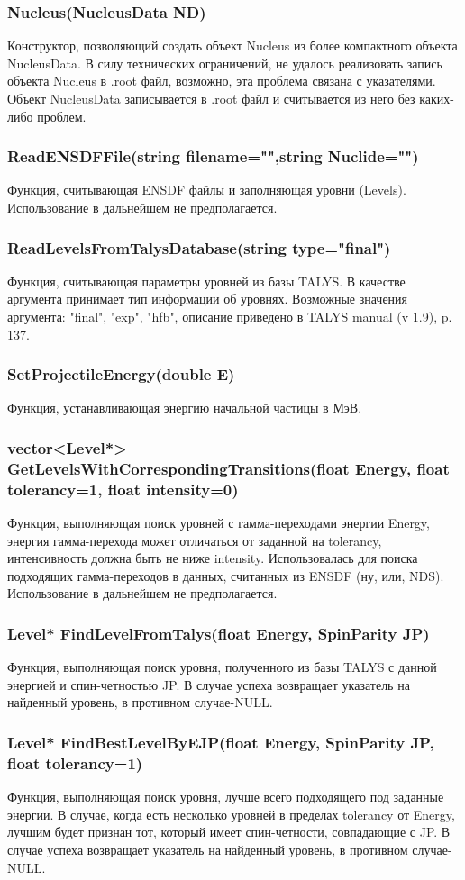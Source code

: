 \documentclass[a4paper,12pt]{extarticle}
\begin{document}
\subsubsection{Nucleus(NucleusData ND)}
Конструктор, позволяющий создать объект Nucleus из более компактного объекта NucleusData. В силу технических ограничений, не удалось реализовать запись объекта Nucleus в .root файл, возможно, эта проблема связана с указателями. Объект NucleusData записывается в .root файл и считывается из него без каких-либо проблем.
\subsubsection{ReadENSDFFile(string filename="",string Nuclide="")}
Функция, считывающая ENSDF файлы и заполняющая уровни (Levels). Использование в дальнейшем не предполагается.
\subsubsection{ReadLevelsFromTalysDatabase(string type="final")}
Функция, считывающая параметры уровней из базы TALYS. В качестве аргумента принимает тип информации об уровнях. Возможные значения аргумента: "final", "exp", "hfb", описание приведено в TALYS manual (v 1.9), p. 137.
\subsubsection{SetProjectileEnergy(double E)}
Функция, устанавливающая энергию начальной частицы в МэВ.
\subsubsection{vector<Level*> GetLevelsWithCorrespondingTransitions(float Energy, float tolerancy=1, float intensity=0)}
Функция, выполняющая поиск уровней с гамма-переходами энергии Energy, энергия гамма-перехода может отличаться от заданной на tolerancy, интенсивность должна быть не ниже intensity. Использовалась для поиска подходящих гамма-переходов в данных, считанных из ENSDF (ну, или, NDS). Использование в дальнейшем не предполагается.
\subsubsection{Level* FindLevelFromTalys(float Energy, SpinParity JP)}
Функция, выполняющая поиск уровня, полученного из базы TALYS с данной энергией и спин-четностью JP. В случае успеха возвращает указатель на найденный уровень, в противном случае-NULL.
\subsubsection{Level* FindBestLevelByEJP(float Energy, SpinParity JP, float tolerancy=1)}
Функция, выполняющая поиск уровня, лучше всего подходящего под заданные энергии. В случае, когда есть несколько уровней в пределах tolerancy от Energy, лучшим будет признан тот, который имеет спин-четности, совпадающие с JP. В случае успеха возвращает указатель на найденный уровень, в противном случае-NULL.
\end{document}
